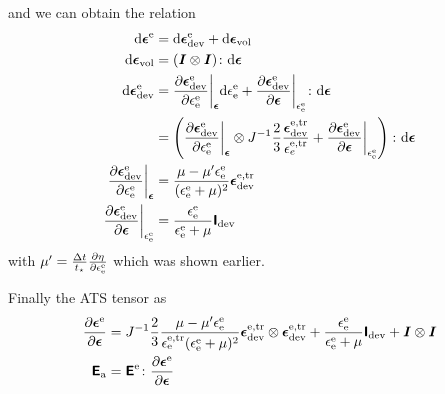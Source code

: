 \documentclass[a4paper,11pt]{article}
\newcommand{\tf}[1]{\text{\boldmath $\sf #1$}}
\newcommand{\ts}[1]{\text{\boldmath $#1$}}
\newcommand{\pderiv}[2]{\frac{\partial #1}{\partial #2}}
\newcommand{\dev}{{\rm dev}}
\newcommand{\vol}{{\rm vol}}
\newcommand{\rmd}{{\rm d}}
\newcommand{\rme}{{\rm e}}
\newcommand{\ATS}{\tf{E}_{\rm a}}
\begin{document}
and we can obtain the relation
\begin{align}
	\rmd\ts\epsilon^\rme &= \rmd\ts\epsilon_\dev^\rme + \rmd\ts\epsilon_\vol \\
	\rmd\ts\epsilon_\vol &= (\ts I\otimes\ts I)\colon\rmd\ts\epsilon\\
	\rmd\ts\epsilon_\dev^\rme &= \pderiv{\ts\epsilon_\dev^\rme}{\epsilon_\rme^\rme}\bigg|_{\ts\epsilon}\rmd\epsilon_\rme^\rme 
		+ \pderiv{\ts\epsilon_\dev^\rme}{\ts\epsilon}\bigg|_{\epsilon_\rme^\rme}\colon\rmd\ts\epsilon \\
		&= \left(\pderiv{\ts\epsilon_\dev^\rme}{\epsilon_\rme^\rme}\bigg|_{\ts\epsilon}\otimes J^{-1}\frac23\frac{\ts\epsilon_\dev^{\rme,\rm tr}}{\epsilon_e^{\rme,\rm tr}}
		+ \pderiv{\ts\epsilon_\dev^\rme}{\ts\epsilon}\bigg|_{\epsilon_\rme^\rme}\right)\colon\rmd\ts\epsilon\\
	\pderiv{\ts\epsilon_\dev^\rme}{\epsilon_\rme^\rme}\bigg|_{\ts\epsilon} &= \frac{\mu-\mu'\epsilon_\rme^\rme}{(\epsilon_\rme^\rme+\mu)^2}\ts\epsilon_\dev^{\rme,\rm tr}\\
	\pderiv{\ts\epsilon_\dev^\rme}{\ts\epsilon}\bigg|_{\epsilon_\rme^\rme} &= \frac{\epsilon_\rme^\rme}{\epsilon_\rme^\rme + \mu} \tf I_\dev
\end{align}
with $\mu' = \frac{\Delta t}{t_\star}\pderiv{\eta}{\epsilon_\rme^\rme}$ which was shown earlier. 

Finally the ATS tensor as
\begin{align}
	\pderiv{\ts\epsilon^\rme}{\ts\epsilon} &= J^{-1} \frac23\frac{\mu-\mu'\epsilon_\rme^\rme}{\epsilon_\rme^{\rme,\rm tr}(\epsilon_\rme^\rme+\mu)^2}
		\ts\epsilon_\dev^{\rme,\rm tr}\otimes\ts\epsilon_\dev^{\rme,\rm tr} + 
		\frac{\epsilon_\rme^\rme}{\epsilon_\rme^\rme+\mu} \tf I_\dev + \ts I\otimes\ts I\\
	\ATS &= \tf E^\rme\colon\pderiv{\ts\epsilon^\rme}{\ts\epsilon}
\end{align}
\end{document}
